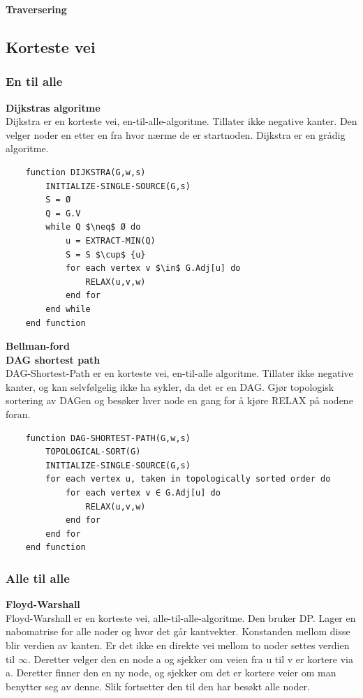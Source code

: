\noindent \textbf{Traversering}

\subsection{Korteste vei}
\subsubsection{En til alle}
\textbf{Dijkstras algoritme}\\
Dijkstra er en korteste vei, en-til-alle-algoritme. Tillater ikke negative kanter. Den velger noder en etter en fra hvor nærme de er startnoden. Dijkstra er en grådig algoritme.

\begin{lstlisting}
    function DIJKSTRA(G,w,s)
	    INITIALIZE-SINGLE-SOURCE(G,s)
    	S = Ø
    	Q = G.V
    	while Q $\neq$ Ø do
    		u = EXTRACT-MIN(Q)
    		S = S $\cup$ {u}
    		for each vertex v $\in$ G.Adj[u] do
    			RELAX(u,v,w)
    		end for
    	end while
    end function
\end{lstlisting}

\textbf{Bellman-ford}\\
\textbf{DAG shortest path}\\
DAG-Shortest-Path er en korteste vei, en-til-alle algoritme. Tillater ikke negative kanter, og kan selvfølgelig ikke ha sykler, da det er en DAG. Gjør topologisk sortering av DAGen og besøker hver node en gang for å kjøre RELAX på nodene foran.

\begin{lstlisting}
    function DAG-SHORTEST-PATH(G,w,s)
    	TOPOLOGICAL-SORT(G)
    	INITIALIZE-SINGLE-SOURCE(G,s)
    	for each vertex u, taken in topologically sorted order do
    		for each vertex v ∈ G.Adj[u] do
    			RELAX(u,v,w)
    		end for
    	end for
    end function

\end{lstlisting}

\subsubsection{Alle til alle}
\textbf{Floyd-Warshall}\\
Floyd-Warshall er en korteste vei, alle-til-alle-algoritme. Den bruker DP. Lager en nabomatrise for alle noder og hvor det går kantvekter. Konstanden mellom disse blir verdien av kanten. Er det ikke en direkte vei mellom to noder settes verdien til $\infty$. Deretter velger den en node a og sjekker om veien fra u til v er kortere via a. Deretter finner den en ny node, og sjekker om det er kortere veier om man benytter seg av denne. Slik fortsetter den til den har besøkt alle noder.

